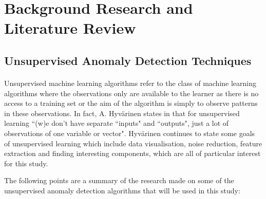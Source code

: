 \documentclass[12pt, twoside]{report}
\begin{document}
	
	\section{Background Research and Literature Review}
	\subsection{Unsupervised Anomaly Detection Techniques}
	\paragraph{ }Unsupervised machine learning algorithms refer to the class of machine learning algorithms where the observations only are available to the learner as there is no access to a training set or the aim of the algorithm is simply to observe patterns in these observations. In fact, A. Hyv{\"a}rinen states in \cite{r:lecturenotes} that for unsupervised learning ``(w)e don't have separate ``inputs" and ``outputs", just a lot of observations of one variable or vector". Hyv{\"a}rinen continues to state some goals of unsupervised learning which include data visualisation, noise reduction, feature extraction and finding interesting components, which are all of particular interest for this study.
	\par The following points are a summary of the research made on some of the unsupervised anomaly detection algorithms that will be used in this study:
\end{document}
